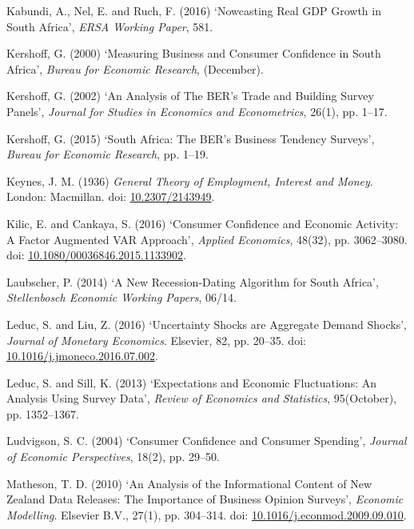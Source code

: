 \documentclass[11pt,]{article}
\begin{document}
\hypertarget{ref-Kabundi2016}{}
Kabundi, A., Nel, E. and Ruch, F. (2016) `Nowcasting Real GDP Growth in
South Africa', \emph{ERSA Working Paper}, 581.

\hypertarget{ref-Kershoff2000}{}
Kershoff, G. (2000) `Measuring Business and Consumer Confidence in South
Africa', \emph{Bureau for Economic Research}, (December).

\hypertarget{ref-Kershoff2002}{}
Kershoff, G. (2002) `An Analysis of The BER's Trade and Building Survey
Panels', \emph{Journal for Studies in Economics and Econometrics},
26(1), pp. 1--17.

\hypertarget{ref-Kershoff2015}{}
Kershoff, G. (2015) `South Africa: The BER's Business Tendency Surveys',
\emph{Bureau for Economic Research}, pp. 1--19.

\hypertarget{ref-Keynes1936}{}
Keynes, J. M. (1936) \emph{General Theory of Employment, Interest and
Money}. London: Macmillan. doi:
\href{https://doi.org/10.2307/2143949}{10.2307/2143949}.

\hypertarget{ref-Kilic2016}{}
Kilic, E. and Cankaya, S. (2016) `Consumer Confidence and Economic
Activity: A Factor Augmented VAR Approach', \emph{Applied Economics},
48(32), pp. 3062--3080. doi:
\href{https://doi.org/10.1080/00036846.2015.1133902}{10.1080/00036846.2015.1133902}.

\hypertarget{ref-Laubscher2014}{}
Laubscher, P. (2014) `A New Recession-Dating Algorithm for South
Africa', \emph{Stellenbosch Economic Working Papers}, 06/14.

\hypertarget{ref-Leduc2016}{}
Leduc, S. and Liu, Z. (2016) `Uncertainty Shocks are Aggregate Demand
Shocks', \emph{Journal of Monetary Economics}. Elsevier, 82, pp. 20--35.
doi:
\href{https://doi.org/10.1016/j.jmoneco.2016.07.002}{10.1016/j.jmoneco.2016.07.002}.

\hypertarget{ref-Leduc2013}{}
Leduc, S. and Sill, K. (2013) `Expectations and Economic Fluctuations:
An Analysis Using Survey Data', \emph{Review of Economics and
Statistics}, 95(October), pp. 1352--1367.

\hypertarget{ref-Ludvigson2004}{}
Ludvigson, S. C. (2004) `Consumer Confidence and Consumer Spending',
\emph{Journal of Economic Perspectives}, 18(2), pp. 29--50.

\hypertarget{ref-Matheson2010}{}
Matheson, T. D. (2010) `An Analysis of the Informational Content of New
Zealand Data Releases: The Importance of Business Opinion Surveys',
\emph{Economic Modelling}. Elsevier B.V., 27(1), pp. 304--314. doi:
\href{https://doi.org/10.1016/j.econmod.2009.09.010}{10.1016/j.econmod.2009.09.010}.
\end{document}
